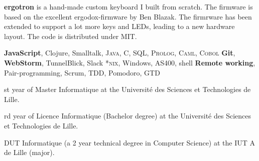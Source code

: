 \begin{rubric}{%
}
 \textbf{ergotron} is a hand-made custom keyboard I built from scratch. The firmware is based on the excellent ergodox-firmware by Ben Blazak. The firmrware has been extended to support a lot more keys and LEDs, leading to a new hardware layout. The code is distributed under MIT.

\entry*[Programming] \textbf{JavaScript}, Clojure, Smalltalk, \textsc{Java}, C, \textsc{SQL}, \textsc{Prolog}, \textsc{Caml}, \textsc{Cobol}
\entry*[Software] \textbf{Git}, \textbf{WebStorm}, TunnelBlick, Slack
\entry*[System] \textsc{*nix}, Windows, AS400, shell
\entry*[Agile] \textbf{Remote working}, Pair-programming, Scrum, TDD, Pomodoro, GTD

\textup{st} year of Master Informatique at the Université des Sciences et Technologies de Lille.

\textup{rd} year of Licence Informatique (Bachelor degree) at the Université des Sciences et Technologies de Lille.

\entry*[2009 - 2011]
DUT Informatique (a 2 year technical degree in Computer Science)  at the IUT A de Lille (major).


\end{rubric}
